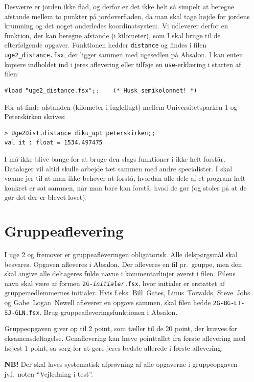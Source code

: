 \documentclass[a4paper,12pt]{article}
\begin{document}
Desværre er jorden ikke flad, og derfor er det ikke helt så simpelt at
beregne afstande mellem to punkter på jordoverfladen, da man skal tage
højde for jordens krumning og det noget anderledes koordinatsystem.  Vi
udleverer derfor en funktion, der kan beregne afstande (i kilometer),
som I skal bruge til de efterfølgende opgaver. Funktionen hedder
\verb|distance| og findes i filen \texttt{uge2\_distance.fsx}, der
ligger sammen med ugesedlen på Absalon. I kan enten kopiere indholdet
ind i jeres aflevering eller tilføje en \verb|use|-erklæring i starten
af filen:
\begin{verbatim}
#load "uge2_distance.fsx";;    (* Husk semikolonnet! *)
\end{verbatim}
For at finde afstanden (kilometer i fugleflugt) mellem
Universitetsparken 1 og Peterskirken skrives:
\begin{verbatim}
> Uge2Dist.distance diku_up1 peterskirken;;
val it : float = 1534.497475
\end{verbatim}
I må ikke blive bange for at bruge den slags funktioner i ikke helt
forstår. Dataloger vil altid skulle arbejde tæt sammen med andre
specialister. I skal vænne jer til at man ikke behøver at forstå,
hvordan alle dele af et program helt konkret er sat sammen, når man
bare kan forstå, hvad de gør (og stoler på at de gør det der er blevet
lovet).

\section{Gruppeaflevering}
\label{sec:gruppeaflevering}
I uge 2 og fremover er gruppeafleveringen obligatorisk.  Alle
delspørgsmål skal besvares.  Opgaven afleveres i Absalon.  Der
afleveres en fil pr.\ gruppe, men den skal angive alle deltageres
fulde navne i kommentarlinjer øverst i filen. Filens navn skal være af
formen \texttt{2G-\textit{initialer}.fsx}, hvor initialer er erstattet
af gruppemedlemmernes initialer. Hvis f.eks. Bill~Gates,
Linus~Torvalds, Steve~Jobs og Gabe~Logan~Newell afleverer en opgave
sammen, skal filen hedde \texttt{2G-BG-LT-SJ-GLN.fsx}. Brug
gruppeafleveringsfunktionen i Absalon.

Gruppeopgaven giver op til 2 point, som tæller til de 20 point, der
kræves for eksamensdeltagelse.  Genaflevering kan hæve pointtallet fra
første aflevering med højest 1 point, så sørg for at gøre jeres bedste
allerede i første aflevering.

\textbf{NB!} Der skal laves systematisk afprøvning af alle opgaverne i
gruppeopgaven jvf.\ noten ``Vejledning i test''.
\end{document}
